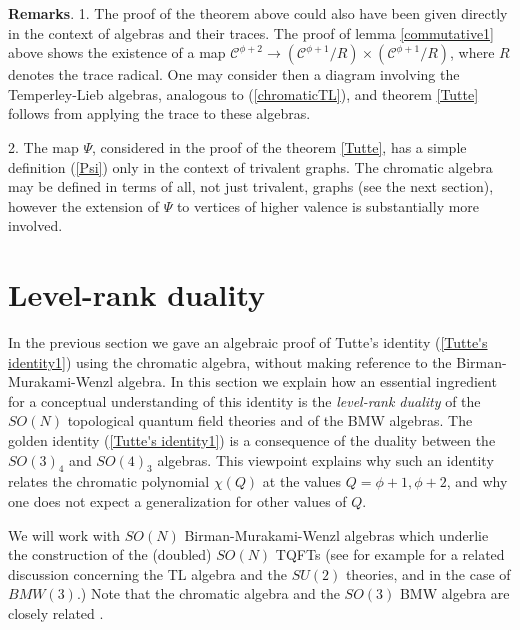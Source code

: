 \documentclass[11pt]{amsart}
\numberwithin{equation}{section}
\theoremstyle{definition}
\begin{document}
{\bf Remarks}. 1. The proof of the theorem above could also have been given directly
in the context of algebras and their traces. The proof of lemma
\ref{commutative1} above shows the existence of a map ${\mathcal
  C}^{{\phi}+2}\longrightarrow ({\mathcal C}^{{\phi}+1}/R)\times ({\mathcal
  C}^{{\phi}+1}/R)$, where $R$ denotes the trace radical. One may consider then a diagram involving the
Temperley-Lieb algebras, analogous to (\ref{chromaticTL}), and theorem
\ref{Tutte} follows from applying the trace to these algebras.

2. The map ${\Psi}$, considered in the proof of the theorem \ref{Tutte}, has a simple
definition (\ref{Psi}) only in the context of trivalent graphs. The chromatic algebra
may be defined in terms of all, not just trivalent, graphs (see the next section), however the
extension of ${\Psi}$ to vertices of higher valence is substantially more involved.














\bigskip

\section{Level-rank duality}
\label{sec:levelrank}


In the previous section we gave an algebraic proof of Tutte's identity
(\ref{Tutte's identity1}) using the chromatic algebra, without making
reference to the Birman-Murakami-Wenzl algebra. In this section we
explain how an essential ingredient for a conceptual understanding of
this identity is the {\em level-rank duality} of the $SO(N)$
topological quantum field theories and of the BMW algebras.
The golden identity (\ref{Tutte's identity1}) is a
consequence of the duality between the $SO(3)_4$ and $SO(4)_3$ algebras.
This viewpoint explains why such an identity relates the
chromatic polynomial ${\chi}(Q)$ at the values $Q={\phi}+1, {\phi}+2$,
and why one does not expect a generalization for other values of
$Q$.



We will work with $SO(N)$
Birman-Murakami-Wenzl algebras which underlie the construction of the
(doubled) $SO(N)$ TQFTs (see for example \cite{F} for a related
discussion concerning the TL algebra and the $SU(2)$ theories, and
\cite[section 3.1]{FK} in the case of $BMW(3)$.) Note that the
chromatic algebra and the $SO(3)$ BMW algebra are closely related
\cite{FK}.
\end{document}
